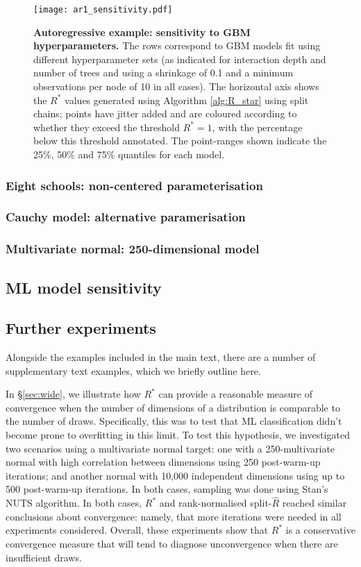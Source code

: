 \documentclass{article}
\begin{document}
\begin{figure}[!htb]
	\centerline{\texttt{[image: ar1\_sensitivity.pdf]}}
	\caption{\textbf{Autoregressive example: sensitivity to GBM hyperparameters.} The rows correspond to GBM models fit using different hyperparameter sets (as indicated for interaction depth and number of trees and using a shrinkage of 0.1 and a minimum observations per node of 10 in all cases). The horizontal axis shows the $R^*$ values generated using Algorithm \ref{alg:R_star} using split chains; points have jitter added and are coloured according to whether they exceed the threshold $R^*=1$, with the percentage below this threshold annotated. The point-ranges shown indicate the 25\%, 50\% and 75\% quantiles for each model.}
	\label{fig:ar1_sensitivity}
\end{figure}

\subsubsection{Eight schools: non-centered parameterisation}

\subsubsection{Cauchy model: alternative paramerisation}

\subsubsection{Multivariate normal: 250-dimensional model}


\subsection{ML model sensitivity}\label{sec:ml_model}

\color{black}

\subsection{Further experiments}\label{sec:further_experiments}
Alongside the examples included in the main text, there are a number of supplementary text examples, which we briefly outline here.

In \S\ref{sec:wide}, we illustrate how $R^*$ can provide a reasonable measure of convergence when the number of dimensions of a distribution is comparable to the number of draws. Specifically, this was to test that ML classification didn't become prone to overfitting in this limit. To test this hypothesis, we investigated two scenarios using a multivariate normal target: one with a 250-multivariate normal with high correlation between dimensions using 250 post-warm-up iterations; and another normal with 10,000 independent dimensions using up to 500 post-warm-up iterations. In both cases, sampling was done using Stan's NUTS algorithm. In both cases, $R^*$ and rank-normalised split-$\widehat{R}$ reached similar conclusions about convergence: namely, that more iterations were needed in all experiments considered. Overall, these experiments show that $R^*$ is a conservative convergence measure that will tend to diagnose unconvergence when there are insufficient draws.
\end{document}
